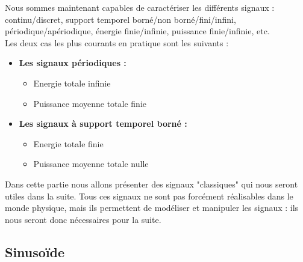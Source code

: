 Nous sommes maintenant capables de caractériser les différents signaux : continu/discret, support temporel borné/non borné/fini/infini, périodique/apériodique, énergie finie/infinie, puissance finie/infinie, etc. \\ 

Les deux cas les plus courants en pratique sont les suivants : \\
\begin{itemize}
\item \textbf{Les signaux périodiques :}
\begin{itemize}
\item Energie totale infinie 
\item Puissance moyenne totale finie  \\
\end{itemize}
\item\textbf{Les signaux à support temporel borné :}
\begin{itemize}
\item Energie totale finie 
\item Puissance moyenne totale nulle \\
\end{itemize}
\end{itemize}

Dans cette partie nous allons présenter des signaux "classiques" qui nous seront utiles dans la suite. Tous ces signaux ne sont pas forcément réalisables dans le monde physique, mais ils permettent de modéliser et manipuler les signaux : ils nous seront donc nécessaires pour la suite.

\subsection{Sinusoïde}

